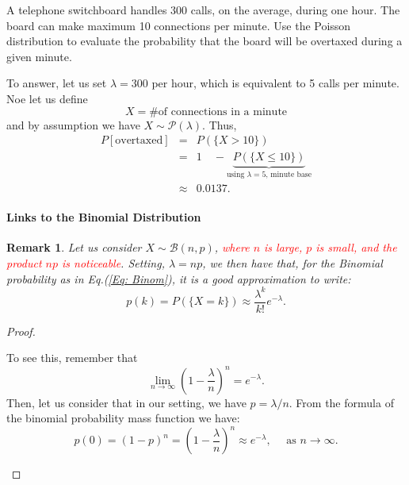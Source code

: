 \documentclass[smaller]{beamer}\usepackage[]{graphicx}\usepackage[]{color}
\newtheorem{remark}{Remark}[section]
\newcommand{\bea}{\begin{eqnarray}}
\newcommand{\eea}{\end{eqnarray}}
\newcommand{\nn}{\nonumber}
\begin{document}
\begin{frame}{\secname}
  \begin{example}
  \begin{footnotesize}
  A telephone switchboard handles 300 calls, on the average, during one hour. The board
  can make maximum 10 connections per minute. Use the Poisson
  distribution to evaluate the probability that the board will be overtaxed during a given minute.

  \medskip

  To answer, let us set  $\lambda = 300$ per hour, which is equivalent to 5 calls per minute. Noe let us define
  $$
  X = \text{\# of connections in a minute}
  $$
  and by assumption we have $X \sim \mathcal{P}(\lambda)$. Thus,
  \bea
  P[\text{overtaxed}] &=& P(\{X > 10\}) \nn \\
  &=& 1 \quad - \underbrace{P(\{X \leq 10\})}_{\text{using $\lambda=5$,  minute base}} \nn \\
  &\approx& 0.0137. \nn
  \eea
  \end{footnotesize}
  \end{example}
\end{frame}


\begin{frame}{\secname}
\framesubtitle{Links to the Binomial Distribution}
  \begin{remark}
  Let us consider $X \sim \mathcal{B}(n,p)$, \textcolor{red} {where $n$ is large, $p$ is small, and the product $np$ is noticeable}. Setting, $\lambda=np$, we
  then have that, for the Binomial probability as in Eq.(\ref{Eq: Binom}), it is a good approximation to write:
  $$
  p(k) = P(\{X=k\}) \approx \frac{\lambda^k}{k!} e^{-\lambda}.
  $$
  \end{remark}
  \pause
  \begin{proof}
  \begin{footnotesize}
  To see this, remember that
  $$
  \lim_{n\rightarrow\infty} \left( 1- \frac{\lambda}{n} \right)^n = e^{-\lambda}.
  $$
  Then, let us consider that in our setting, we have $p=\lambda/n$. From the formula of the binomial probability mass function we have:
  $$
  p(0) = (1-p)^{n}=\left( 1- \frac{\lambda}{n} \right)^{n} \approx e^{-\lambda}, \quad \text{\ as \ \ } n\rightarrow\infty.
  $$
  \end{footnotesize}
  \end{proof}
\end{frame}
\end{document}
